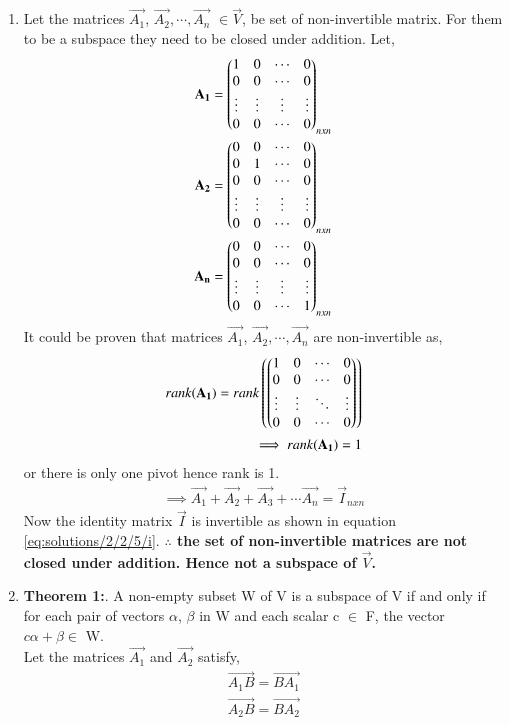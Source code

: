 \begin{enumerate}
\item Let the matrices $\vec{A_1}$, $\vec{A_2},\cdots, \vec{A_n}$ $\in \vec{V}$, be set of non-invertible matrix. For them to be a subspace they need to be closed under addition. Let,
\begin{align}
\mathbf{A_1} = \begin{pmatrix}1&0&\cdots&0\\0&0&\cdots&0\\\vdots&\vdots&\vdots&\vdots\\0&0&\cdots&0\end{pmatrix}_{nxn}\\
\mathbf{A_2} = \begin{pmatrix}0&0&\cdots&0\\0&1&\cdots&0\\0&0&\cdots&0\\\vdots&\vdots&\vdots&\vdots\\0&0&\cdots&0\end{pmatrix}_{nxn}\\
\mathbf{A_n}=\begin{pmatrix}0&0&\cdots&0\\0&0&\cdots&0\\\vdots&\vdots&\vdots&\vdots\\0&0&\cdots&1\end{pmatrix}_{nxn}\\
\end{align}  
It could be proven that matrices $\vec{A_1}$, $\vec{A_2}, \cdots, \vec{A_n}$ are non-invertible as,
\begin{align}
rank(\mathbf{A_1}) = rank\left(\begin{pmatrix}1&0&\cdots&0\\0&0&\cdots&0\\\vdots&\vdots&\ddots&\vdots\\0&0&\cdots&0\end{pmatrix}\right)\\
\implies rank(\mathbf{A_1}) = 1
\end{align}
or there is only one pivot hence rank is 1. 
\begin{align}
\implies \vec{A_1}+\vec{A_2}+\vec{A_3}+\cdots\vec{A_n} = \vec{I}_{nxn}
\end{align}
Now the identity matrix $\vec{I}$ is invertible as shown in equation \eqref{eq:solutions/2/2/5/i}. \textbf{$\therefore$ the set of non-invertible matrices are not closed under addition. Hence not a subspace of $\vec{V}$.}
\item \textbf{Theorem 1:}. A non-empty subset W of V is a subspace of V if and only if for each pair of vectors $\alpha$, $\beta$ in W and each scalar c $\in$ F, the vector $c\alpha+\beta \in$ W. \\
Let the matrices $\vec{A_1}$ and $\vec{A_2}$ satisfy,
\begin{align}
\vec{A_1B}=\vec{BA_1}\label{eq:solutions/2/2/5/s1}\\
\vec{A_2B}=\vec{BA_2}\label{eq:solutions/2/2/5/s2}

\end{align}
\end{enumerate}
